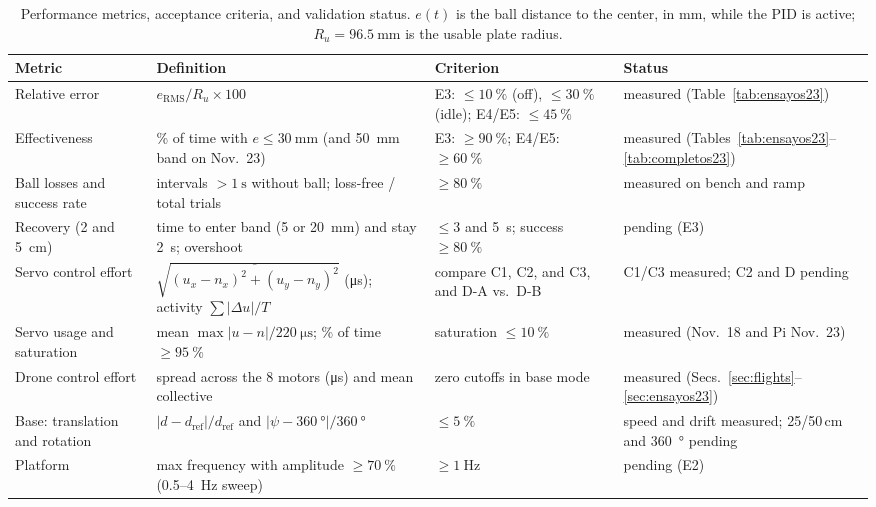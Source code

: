 \begin{table}[!htbp]
\centering
\small
\caption{Performance metrics, acceptance criteria, and validation status. $e(t)$ is the ball distance to the center, in mm, while the PID is active; $R_u=\SI{96.5}{\milli\metre}$ is the usable plate radius.}
\label{tab:metricas}
\begin{tabularx}{\textwidth}{@{}>{\raggedright\arraybackslash}p{}>{\raggedright\arraybackslash}X>{\raggedright\arraybackslash}p{}>{\raggedright\arraybackslash}p{}@{}}
\toprule
Metric & Definition & Criterion & Status \\
\midrule
Relative error & $e_{\mathrm{RMS}}/R_u\times100$ & E3: $\le\SI{10}{\percent}$ (off), $\le\SI{30}{\percent}$ (idle); E4/E5: $\le\SI{45}{\percent}$ & measured (Table~\ref{tab:ensayos23}) \\
Effectiveness & \% of time with $e\le\SI{30}{\milli\metre}$ (and \SI{50}{\milli\metre} band on Nov.~23) & E3: $\ge\SI{90}{\percent}$; E4/E5: $\ge\SI{60}{\percent}$ & measured (Tables~\ref{tab:ensayos23}--\ref{tab:completos23}) \\
Ball losses and success rate & intervals $>\SI{1}{\second}$ without ball; loss-free / total trials & $\ge\SI{80}{\percent}$ & measured on bench and ramp \\
Recovery (2 and \SI{5}{\centi\metre}) & time to enter band (5 or \SI{20}{\milli\metre}) and stay \SI{2}{\second}; overshoot & $\le$3 and \SI{5}{\second}; success $\ge\SI{80}{\percent}$ & pending (E3) \\
Servo control effort & $\sqrt{\overline{(u_x-n_x)^2+(u_y-n_y)^2}}$ (\si{\micro\second}); activity $\sum|\Delta u|/T$ & compare C1, C2, and C3, and D-A vs.\ D-B & C1/C3 measured; C2 and D pending \\
Servo usage and saturation & mean $\max|u-n|/\SI{220}{\micro\second}$; \% of time $\ge\SI{95}{\percent}$ & saturation $\le\SI{10}{\percent}$ & measured (Nov.~18 and Pi Nov.~23) \\
Drone control effort & spread across the 8 motors (\si{\micro\second}) and mean collective & zero cutoffs in base mode & measured (Secs.~\ref{sec:flights}--\ref{sec:ensayos23}) \\
Base: translation and rotation & $|d-d_{\mathrm{ref}}|/d_{\mathrm{ref}}$ and $|\psi-\SI{360}{\degree}|/\SI{360}{\degree}$ & $\le\SI{5}{\percent}$ & speed and drift measured; 25/50\,cm and \SI{360}{\degree} pending \\
Platform & max frequency with amplitude $\ge\SI{70}{\percent}$ (0.5--\SI{4}{\hertz} sweep) & $\ge\SI{1}{\hertz}$ & pending (E2) \\
\bottomrule
\end{tabularx}
\end{table}

